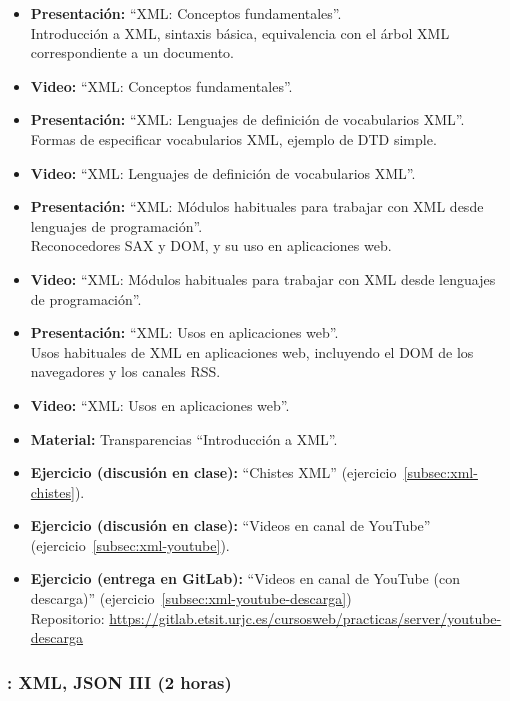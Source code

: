 \documentclass[a4paper,12pt]{article}
\begin{document}
\begin{itemize}
\item \textbf{Presentación:} ``XML: Conceptos fundamentales''. \\
  Introducción a XML, sintaxis básica, equivalencia con el árbol XML correspondiente a un documento.
\item \textbf{Video:} ``XML: Conceptos fundamentales''.

\item \textbf{Presentación:} ``XML: Lenguajes de definición de vocabularios XML''. \\
  Formas de especificar vocabularios XML, ejemplo de DTD simple.
\item \textbf{Video:} ``XML: Lenguajes de definición de vocabularios XML''.
\item \textbf{Presentación:} ``XML: Módulos habituales para trabajar con XML desde lenguajes de programación''. \\
  Reconocedores SAX y DOM, y su uso en aplicaciones web.
\item \textbf{Video:} ``XML: Módulos habituales para trabajar con XML desde lenguajes de programación''.
\item \textbf{Presentación:} ``XML: Usos en aplicaciones web''. \\
  Usos habituales de XML en aplicaciones web, incluyendo el DOM de los navegadores y los canales RSS.
\item \textbf{Video:} ``XML: Usos en aplicaciones web''.
\item \textbf{Material:} Transparencias ``Introducción a XML''.
\item \textbf{Ejercicio (discusión en clase):} ``Chistes XML'' (ejercicio~\ref{subsec:xml-chistes}).
\item \textbf{Ejercicio (discusión en clase):} ``Videos en canal de YouTube'' (ejercicio~\ref{subsec:xml-youtube}).
\item \textbf{Ejercicio (entrega en GitLab):} ``Videos en canal de YouTube (con descarga)'' (ejercicio~\ref{subsec:xml-youtube-descarga}) \\
  Repositorio: \url{https://gitlab.etsit.urjc.es/cursosweb/practicas/server/youtube-descarga}
\end{itemize}

\subsubsection{\juevesM: XML, JSON III (2 horas)}
\label{cal:juevesM}
\end{document}
